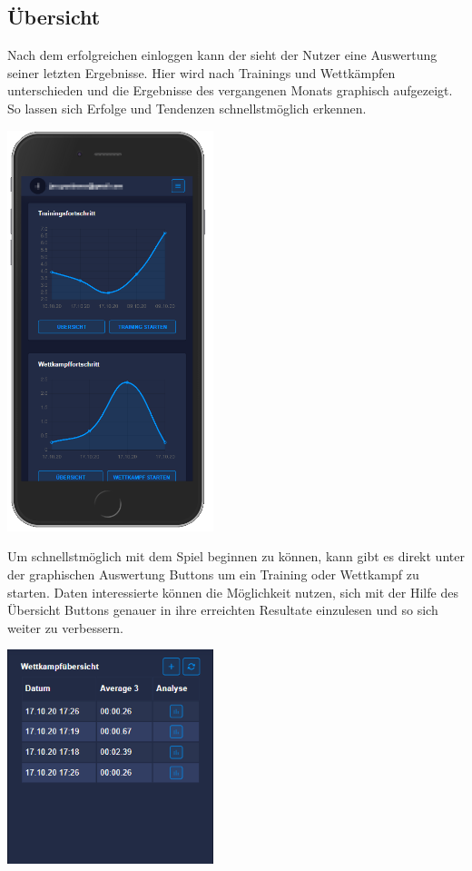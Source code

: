 \documentclass[a4paper]{article}
\theoremstyle{definition}
\begin{document}
\subsection*{Übersicht}
Nach dem erfolgreichen einloggen kann der sieht der Nutzer eine Auswertung seiner letzten Ergebnisse. Hier wird nach Trainings und Wettkämpfen unterschieden und die Ergebnisse des vergangenen Monats graphisch aufgezeigt. So lassen sich Erfolge und Tendenzen schnellstmöglich erkennen.
\vspace{0.25cm}
\begin{center}
	\includegraphics[width= 6cm, keepaspectratio]{img/overview}
\end{center}
\vspace{0.25cm}
Um schnellstmöglich mit dem Spiel beginnen zu können, kann gibt es direkt unter der graphischen Auswertung Buttons um ein Training oder Wettkampf zu starten. Daten interessierte können die Möglichkeit nutzen, sich mit der Hilfe des Übersicht Buttons genauer in ihre erreichten Resultate einzulesen und so sich weiter zu verbessern.
\begin{center}
	\includegraphics[width= 6cm, keepaspectratio]{img/competitionoverview}
\end{center}
\end{document}
